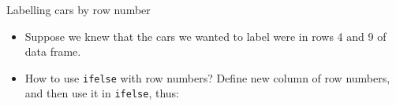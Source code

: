 \documentclass[ignorenonframetext,]{beamer}
\newenvironment{Shaded}{\begin{snugshade}}{\end{snugshade}}
\newcommand{\DataTypeTok}[1]{\textcolor[rgb]{0.13,0.29,0.53}{#1}}
\newcommand{\DecValTok}[1]{\textcolor[rgb]{0.00,0.00,0.81}{#1}}
\newcommand{\KeywordTok}[1]{\textcolor[rgb]{0.13,0.29,0.53}{\textbf{#1}}}
\newcommand{\NormalTok}[1]{#1}
\newcommand{\OperatorTok}[1]{\textcolor[rgb]{0.81,0.36,0.00}{\textbf{#1}}}
\newcommand{\StringTok}[1]{\textcolor[rgb]{0.31,0.60,0.02}{#1}}
\providecommand{\tightlist}{%
  \setlength{\itemsep}{0pt}\setlength{\parskip}{0pt}}
\begin{document}
\begin{frame}[fragile]{Labelling cars by row number}
\protect\hypertarget{labelling-cars-by-row-number}{}

\begin{itemize}
\tightlist
\item
  Suppose we knew that the cars we wanted to label were in rows 4 and 9
  of data frame.
\item
  How to use \texttt{ifelse} with row numbers? Define new column of row
  numbers, and then use it in \texttt{ifelse}, thus:
\end{itemize}

\begin{Shaded}
\end{Shaded}

\end{frame}
\end{document}

